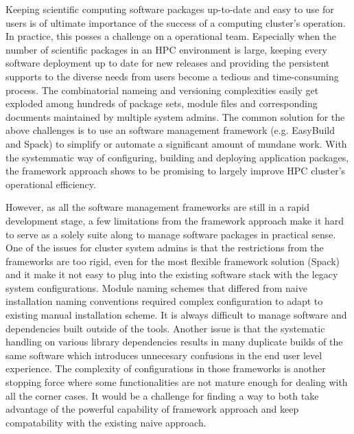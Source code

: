 \documentclass[conference]{IEEEtran}
\begin{document}
Keeping scientific computing software packages up-to-date and easy to use for users is of ultimate importance of the success of a computing cluster's operation.
In practice, this posses a challenge on a operational team.
Especially when the number of scientific packages in an HPC environment is large, keeping every software deployment up to date for new releases and providing the persistent supports to the diverse needs from users become a tedious and time-consuming process. 
The combinatorial nameing and versioning complexities easily get exploded among hundreds of package sets, module files and corresponding documents maintained by multiple system admins. 
The common solution for the above challenges is to use an software management framework (e.g. EasyBuild and Spack) to simplify or automate a significant amount of mundane work. 
With the systemmatic way of configuring, building and deploying application packages, the framework approach shows to be promising to largely improve HPC cluster's operational efficiency. 

However, as all the software management frameworks are still in a rapid development stage, a few limitations from the framework approach make it hard to serve as a solely suite along to manage software packages in practical sense.
One of the issues for cluster system admins is that the restrictions from the frameworks are too rigid, even for the most flexible framework solution (Spack) and it make it not easy to plug into the existing software stack with the legacy system configurations. 
Module naming schemes that differed from naive installation naming conventions required complex configuration to adapt to existing manual installation scheme. It is always difficult to manage software and dependencies built outside of the tools. 
Another issue is that the systematic handling on various library dependencies results in many duplicate builds of the same software which introduces unnecesary confusions in the end user level experience. 
The complexity of configurations in those frameworks is another stopping force where some functionalities are not mature enough for dealing with all the corner cases. It would be a challenge for finding a way to both take advantage of the powerful capability of framework approach and keep compatability with the existing naive approach.  
\end{document}

